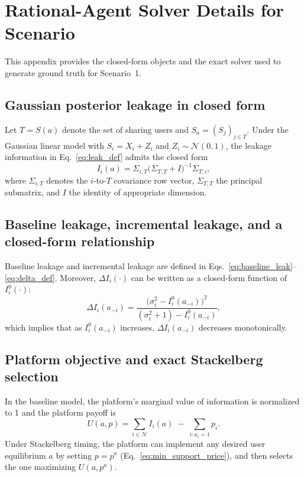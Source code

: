 \documentclass[lettersize,journal]{IEEEtran}
\begin{document}
\section{Rational-Agent Solver Details for Scenario}
\label{app:rational_agent_solver}

This appendix provides the closed-form objects and the exact solver used to generate ground truth for Scenario~1.

\subsection{Gaussian posterior leakage in closed form}
Let $T=S(a)$ denote the set of sharing users and $S_a=(S_j)_{j\in T}$.
Under the Gaussian linear model with $S_i=X_i+Z_i$ and $Z_i\sim\mathcal{N}(0,1)$,
the leakage information in Eq.~\eqref{eq:leak_def} admits the closed form
\begin{equation}
I_i(a)=\Sigma_{i,T}\big(\Sigma_{T,T}+I\big)^{-1}\Sigma_{T,i},
\label{eq:leak_closed_form_app}
\end{equation}
where $\Sigma_{i,T}$ denotes the $i$-to-$T$ covariance row vector, $\Sigma_{T,T}$ the principal submatrix, and $I$ the identity of appropriate dimension.

\subsection{Baseline leakage, incremental leakage, and a closed-form relationship}
Baseline leakage and incremental leakage are defined in Eqs.~\eqref{eq:baseline_leak}--\eqref{eq:delta_def}.
Moreover, $\Delta I_i(\cdot)$ can be written as a closed-form function of $I_i^{0}(\cdot)$:
\begin{equation}
\Delta I_i(a_{-i})
=
\frac{\big(\sigma_i^2-I_i^{0}(a_{-i})\big)^2}{(\sigma_i^2+1)-I_i^{0}(a_{-i})},
\label{eq:deltaI_closed_form_app}
\end{equation}
which implies that as $I_i^{0}(a_{-i})$ increases, $\Delta I_i(a_{-i})$ decreases monotonically.

\subsection{Platform objective and exact Stackelberg selection}
In the baseline model, the platform's marginal value of information is normalized to 1 and the platform payoff is
\begin{equation}
U(a,p)=\sum_{i\in\mathcal{N}} I_i(a)\;-\;\sum_{i:a_i=1} p_i.
\label{eq:platform_obj_app}
\end{equation}
Under Stackelberg timing, the platform can implement any desired user equilibrium $a$ by setting $p=p^a$ (Eq.~\eqref{eq:min_support_price}), and then selects the one maximizing $U(a,p^a)$.
\end{document}
